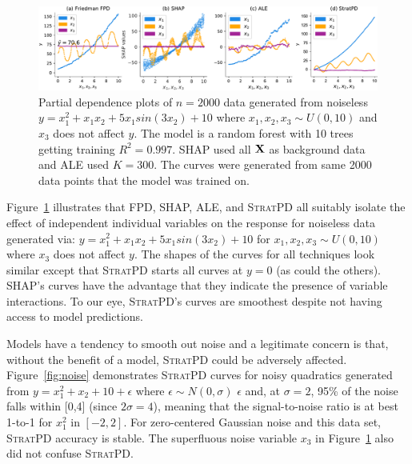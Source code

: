 \documentclass[smallextended]{svjour3}       %
\newcommand{\figref}[1]{Figure~\ref{#1}}
\newcommand{\spd}{\fontfamily{cmr}\textsc{\small StratPD}}
\begin{document}
\begin{figure}[!htbp]
\begin{center}
\includegraphics[scale=0.41]{images/interactions.pdf}\vspace{-2mm}
\caption{\small  Partial dependence plots of $n=2000$ data generated from noiseless $y = x_1^2 + x_1 x_2 + 5 x_1 sin(3 x_2) + 10$ where $x_1,x_2,x_3 \sim U(0,10)$ and $x_3$ does not affect $y$. The model is a random forest with 10 trees getting training $R^2=0.997$. SHAP used all $\bf X$ as background data and ALE used $K=300$. The curves were generated from same 2000 data points that the model was trained on.}
\label{fig:interactions}
\end{center}
\end{figure}

\figref{fig:interactions} illustrates that FPD, SHAP, ALE, and \spd{} all suitably isolate the effect of independent individual variables on the response for noiseless data generated via: $y = x_1^2 + x_1 x_2 + 5 x_1 sin(3 x_2) + 10$ for $x_1,x_2,x_3 \sim U(0,10)$ where $x_3$ does not affect $y$. The shapes of the curves for all techniques look similar except that \spd{} starts all curves at $y=0$ (as could the others). SHAP's curves have the advantage that they indicate the presence of variable interactions. To our eye, \spd's curves are smoothest despite not having access to model predictions.



Models have a tendency to smooth out noise and a legitimate concern is that, without the benefit of a model, \spd{} could be adversely affected. \figref{fig:noise} demonstrates \spd{} curves for noisy quadratics generated from $y = x_1^2 + x_2 + 10 + \epsilon$ where $\epsilon \sim N(0,\sigma)$ $\epsilon$ and, at $\sigma=2$, 95\% of the noise falls within [0,4] (since $2\sigma = 4$), meaning that the signal-to-noise ratio is at best 1-to-1 for $x_1^2$ in $[-2,2]$. For zero-centered Gaussian noise and this data set, \spd{} accuracy is stable.  The superfluous noise variable $x_3$ in \figref{fig:interactions} also did not confuse \spd.
\end{document}
